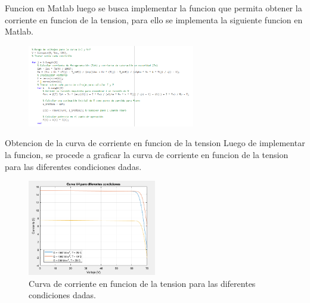 \documentclass[
    10pt,
    aspectratio=169,
    xcolor={dvipsnames},
    spanish,
    ]{beamer}
\begin{document}
\begin{frame}
  \begin{block}{Funcion en Matlab}
    luego se busca implementar la funcion que permita obtener la corriente en funcion de la tension, para ello se implementa la siguiente funcion en Matlab.
\begin{figure}
  \centering
  \includegraphics[width=0.65\textwidth]{Figure_5.png}
\end{figure}
\end{block}
\end{frame}
\begin{frame}
  \begin{block}{Obtencion de la curva de corriente en funcion de la tension}
    Luego de implementar la funcion, se procede a graficar la curva de corriente en funcion de la tension para las diferentes condiciones dadas.
    \begin{figure}
      \centering
      \includegraphics[width=0.5\textwidth]{Figure_6.png}
      \caption{Curva de corriente en funcion de la tension para las diferentes condiciones dadas.}
    \end{figure}
  \end{block}
\end{frame}
\end{document}
